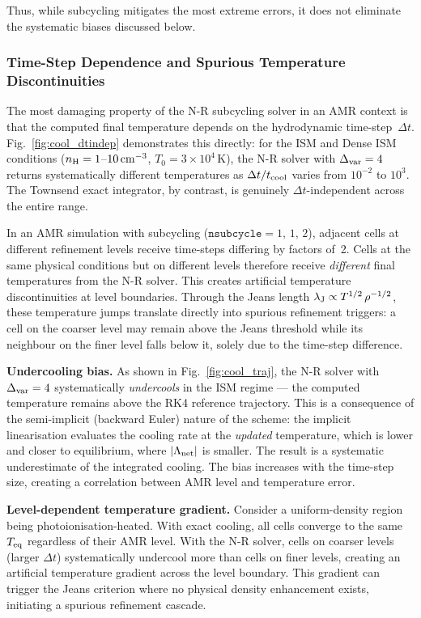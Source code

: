 \documentclass[fleqn,usenatbib]{mnras}
\newcommand{\lJ}{\lambda_{\rm J}}
\newcommand{\code}[1]{\texttt{#1}}
\begin{document}
Thus, while subcycling mitigates the most extreme errors, it
does not eliminate the systematic biases discussed below.

\subsubsection{Time-Step Dependence and Spurious Temperature
  Discontinuities}
\label{sec:overshoot}

The most damaging property of the N-R subcycling solver in an AMR
context is that the computed final temperature depends on the
hydrodynamic time-step~$\Delta t$.
Fig.~\ref{fig:cool_dtindep} demonstrates this directly: for the ISM
and Dense ISM conditions ($n_{\rm H} = 1$--$10\,{\rm cm}^{-3}$,
$T_0 = 3 \times 10^4\,$K), the N-R solver with
$\Delta_{\rm var} = 4$ returns systematically different temperatures
as $\Delta t / t_{\rm cool}$ varies from $10^{-2}$ to $10^3$.
The Townsend exact integrator, by contrast, is genuinely
$\Delta t$-independent across the entire range.

In an AMR simulation with subcycling ($\code{nsubcycle} = 1,\,1,\,2$),
adjacent cells at different refinement levels receive time-steps
differing by factors of~2.  Cells at the same physical conditions
but on different levels therefore receive \emph{different} final
temperatures from the N-R solver.  This creates artificial temperature
discontinuities at level boundaries.  Through the Jeans length
$\lJ \propto T^{1/2}\,\rho^{-1/2}$, these temperature jumps translate
directly into spurious refinement triggers: a cell on the coarser
level may remain above the Jeans threshold while its neighbour on
the finer level falls below it, solely due to the time-step difference.

\textbf{Undercooling bias.}
As shown in Fig.~\ref{fig:cool_traj}, the N-R solver with
$\Delta_{\rm var} = 4$ systematically \emph{undercools} in the ISM
regime --- the computed temperature remains above the RK4 reference
trajectory.  This is a consequence of the semi-implicit (backward
Euler) nature of the scheme: the implicit linearisation evaluates the
cooling rate at the \emph{updated} temperature, which is lower and
closer to equilibrium, where $|\Lambda_{\rm net}|$ is smaller.  The
result is a systematic underestimate of the integrated cooling.  The
bias increases with the time-step size, creating a correlation between
AMR level and temperature error.

\textbf{Level-dependent temperature gradient.}
Consider a uniform-density region being photoionisation-heated.  With
exact cooling, all cells converge to the same $T_{\rm eq}$ regardless
of their AMR level.  With the N-R solver, cells on coarser levels
(larger $\Delta t$) systematically undercool more than cells on finer
levels, creating an artificial temperature gradient across the level
boundary.  This gradient can trigger the Jeans criterion where no
physical density enhancement exists, initiating a spurious refinement
cascade.
\end{document}
